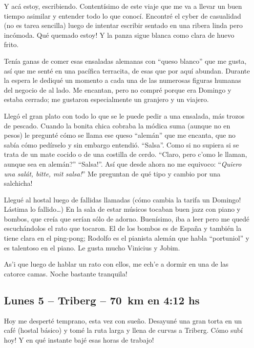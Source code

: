 Y ac\'a estoy, escribiendo. Content\'isimo de este viaje que
me va a llevar un buen tiempo asimilar y entender todo lo que conoc\'i.
Encontr\'e el cyber de casualidad (no es tarea sencilla) luego de intentar
escribir sentado en una ribera linda pero inc\'omoda. \textexclamdown Qu\'e
quemado estoy! Y la panza sigue blanca como clara de huevo frito.

Ten\'ia ganas de comer esas ensaladas alemanas con ``queso blanco'' que me
gusta, as\'i que me sent\'e en una pac\'ifica terracita, de esas que por aqu\'i
abundan. Durante la espera le dediqu\'e un momento a cada una de las numerosas
figuras humanas del negocio de al lado. Me encantan, pero no compr\'e porque era
Domingo y estaba cerrado; me gustaron especialmente un granjero y un viajero.

Lleg\'o el gran plato con todo lo que se le puede pedir a una ensalada, m\'as
trozos de pescado. Cuando la bonita chica cobraba la m\'odica suma
(aunque no en pesos) le pregunt\'e c\'omo se llama ese queso ``alem\'an'' que
me encanta, que no sab\'ia c\'omo ped\'irselo y sin embargo entendi\'o.
``Salsa''. Como si no supiera si se trata de un mate cocido o de una costilla
de cerdo. ``Claro, \textquestiondown pero c'omo le llaman, aunque sea en
alem\'an?'' ``\textexclamdown Salsa!''. As\'i que desde ahora no me equivoco:
``\emph{Quiero una sal\'at, bitte, mit salsa!}'' \textexclamdown Me preguntan
de qu\'e tipo y cambio por una salchicha!

Llegu\'e al hostal luego de fallidas llamadas (\textexclamdown c\'omo cambia
la tarifa un Domingo! L\'astima lo fallido\ldots) En la sala de estar
m\'usicos tocaban buen jazz con piano y bombos, que cre\'ia que ser\'ian
s\'olo de adorno. Buen\'isimo, iba a leer pero me qued\'e escuch\'andolos el
rato que tocaron. El de los bombos es de Espa\~na y tambi\'en la tiene clara
en el ping-pong; Rodolfo es el pianista alem\'an que habla ``portuniol'' y es
talentoso en el piano. Le gusta mucho Vinicius y Jobim.

As'i que luego de hablar un rato con ellos, me ech'e a dormir en una de las
catorce camas. \textexclamdown Noche bastante tranquila!

\subsection*{Lunes 5 -- Triberg -- 70~km en 4:12 hs}

Hoy me despert\'e temprano, esta vez con sue\~no. Desayun\'e una gran torta en
un caf\'e (hostal b\'asico) y tom\'e la ruta larga y llena de curvas a
Triberg. \textexclamdown C\'omo sub\'i hoy! \textexclamdown Y en qu\'e instante
baj\'e esas horas de trabajo!

